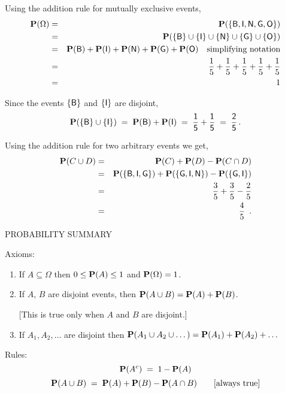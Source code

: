 \begin{ExerciseList}

Using the addition rule for mutually exclusive events,
\begin{eqnarray*}
\mathbf{P}(\Omega)
&=& \mathbf{P}(\mathsf{\{B,I,N,G,O\}})\\
&=& \mathbf{P}(\{\sf{B}\} \cup\{\sf{I}\}\cup \{\sf{N}\} \cup \{\sf{G}\} \cup \{\sf{O}\})\\
&=& \mathbf{P}(\sf B)+\mathbf{P}(\sf I)+\mathbf{P}(\sf N)+\mathbf{P}(\sf G)+\mathbf{P}(\sf O) \quad \text{simplifying notation} \\
&=& \frac{1}{5}+\frac{1}{5}+\frac{1}{5}+\frac{1}{5}+\frac{1}{5}\\
&=& 1
\end{eqnarray*}

\item Since the   events $\{\sf B\}$ and $\{\sf I\}$ are disjoint,
$$
\mathbf{P}(\{\sf{B}\} \cup \{\sf{I}\})\;=\;\mathbf{P}(\sf B)+\mathbf{P}(\sf I)\;=\;\frac{1}{5}+\frac{1}{5}\;=\;\frac{2}{5}\,.
$$


\medskip


\item  Using the addition rule for two arbitrary events we get,
\begin{eqnarray*}
\mathbf{P}(C \cup D) &=& \mathbf{P}(C)+\mathbf{P}(D)-\mathbf{P}(C\cap D)\\& =& \mathbf{P}(\{\sf{B},\sf{I},\sf{G}\}) + \mathbf{P}(\{\sf{G},\sf{I},\sf{N}\}) - \mathbf{P}(\{\sf{G},\sf{I}\})\\
& =& \frac{3}{5} +\frac{3}{5} - \frac{2}{5}\\& = &\frac{4}{5} \enspace .
\end{eqnarray*}
\ee


\end{ExerciseList}


\begin{framed}
PROBABILITY SUMMARY

\medskip

Axioms:
\begin{enumerate}
\item If $A\subseteq \Omega$ then $0\leq \mathbf{P}(A)\leq 1$ and $\mathbf{P}(\Omega)=1$.
\item If $A$, $B$ are disjoint events, then $\mathbf{P}(A\cup B)=\mathbf{P}(A)+\mathbf{P}(B)$.

[This is true only when $A$ and $B$ are disjoint.]
\item If $A_1,A_2,\dots$ are disjoint then $\mathbf{P}(A_1\cup A_2
\cup\dots)=\mathbf{P}(A_1)+\mathbf{P}(A_2)+\dots$
\end{enumerate}
Rules:
$$\mathbf{P}(A^c)\;=\;1-\mathbf{P}(A)$$
$$\mathbf{P}(A\cup B)\;=\;\mathbf{P}(A)+\mathbf{P}(B)-\mathbf{P}(A\cap B) \qquad [\textrm{always true}]$$
\end{framed}


